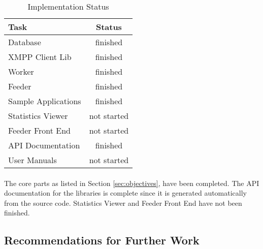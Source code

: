 \begin{table}[H]
\begin{tabularx}{\linewidth}{lc}
\toprule
\textbf{Task} & \textbf{Status} \\
\midrule
\endhead
Database            & finished \\
XMPP Client Lib     & finished \\
Worker              & finished \\
Feeder              & finished \\
Sample Applications & finished \\
Statistics Viewer   & not started \\
Feeder Front End    & not started \\
API Documentation   & finished \\
User Manuals        & not started \\
\bottomrule
\end{tabularx}
\caption{Implementation Status}
\label{tab:impstatus}
\end{table}

\paragraph{}
The core parts as listed in Section \ref{sec:objectives}, have been completed. The API documentation for the libraries is complete since it is generated automatically from the source code. Statistics Viewer and Feeder Front End have not been finished.


\subsection{Recommendations for Further Work}
